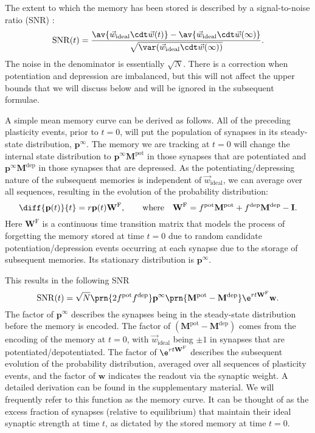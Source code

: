\documentclass{article} %
\DeclareMathOperator{\snr}{SNR}
\newcommand{\wv}{\vec{w}}
\newcommand{\wvi}{\vec{w}_\text{ideal}}
\newcommand{\I}{\mathbf{I}}
\newcommand{\pr}{\mathbf{p}}
\newcommand{\eq}{\pr^\infty}
\newcommand{\w}{\mathbf{w}}
\newcommand{\W}{\mathbf{W}}
\newcommand{\M}{\mathbf{M}}
\newcommand{\frg}{\W^{\mathrm{F}}}
\newcommand{\pot}{^{\text{pot}}}
\newcommand{\dep}{^{\text{dep}}}
\begin{document}
The extent to which the memory has been stored is described by a signal-to-noise ratio (SNR) \cite{Fusi2005cascade,Fusi2007multistate}:
%
\begin{equation}\label{eq:SNRdef}
  \snr(t) = \frac{\av{\wv_\text{ideal}\cdt\wv(t)} - \av{\wv_\text{ideal}\cdt\wv(\infty)}}
     {\sqrt{\var(\wv_\text{ideal}\cdt\wv(\infty))}}.
\end{equation}
%
The noise in the denominator is essentially $\sqrt{N}$.
There is a correction when potentiation and depression are imbalanced, but this will not affect the upper bounds that we will discuss below and will be ignored in the subsequent formulae.

A simple mean memory curve can be derived as follows.
All of the preceding plasticity events, prior to $t=0$, will put the population of synapses in its steady-state distribution, $\eq$.
The memory we are tracking at $t=0$ will change the internal state distribution to $\eq\M\pot$ in those synapses that are potentiated and $\eq\M\dep$ in those synapses that are depressed.
As the potentiating/depressing nature of the subsequent memories is independent of $\wvi$, we can average over all sequences, resulting in the evolution of the probability distribution:
%
\begin{equation}\label{eq:evol}
  \diff{\pr(t)}{t} = r\pr(t)\frg,
  \qquad \text{where} \quad
  \frg = f\pot\M\pot + f\dep\M\dep - \I.
\end{equation}
%
Here $\frg$ is a continuous time transition matrix that models the process of forgetting the memory stored at time $t=0$ due to random candidate potentiation/depression events occurring at each synapse due to the storage of subsequent memories.
Its stationary distribution is $\eq$.


This results in the following SNR
%
\begin{equation}\label{eq:SNRcalc}
  \snr(t) = \sqrt{N}\prn{2 f\pot f\dep} \eq \prn{\M\pot-\M\dep} \e^{rt\frg} \w.
\end{equation}
%
The factor of $\eq$ describes the synapses being in the steady-state distribution before the memory is encoded. The factor of $(\M\pot-\M\dep)$ comes from the encoding of the memory at $t=0$, with $\wvi$ being $\pm1$ in synapses that are potentiated/depotentiated. The factor of $\e^{rt\frg}$ describes the subsequent evolution of the probability distribution, averaged over all sequences of plasticity events, and the factor of $\w$ indicates the readout via the synaptic weight.
A detailed derivation can be found in the supplementary material.
We will frequently refer to this function as the memory curve.
It can be thought of as the excess fraction of synapses (relative to equilibrium) that maintain their ideal synaptic strength at time $t$, as dictated by the stored memory at time $t=0$.
\end{document}

